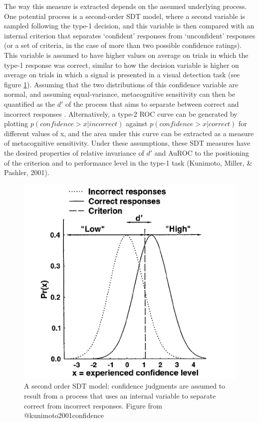\documentclass[12pt,twoside]{reedthesis}
\begin{document}
The way this measure is extracted depends on the assumed underlying process. One potential process is a second-order SDT model, where a second variable is sampled following the type-1 decision, and this variable is then compared with an internal criterion that separates `confident' responses from `unconfident' responses (or a set of criteria, in the case of more than two possible confidence ratings). This variable is assumed to have higher values on average on trials in which the type-1 response was correct, similar to how the decision variable is higher on average on trials in which a signal is presented in a visual detection task (see figure \ref{fig:app1-kunimoto}). Assuming that the two distributions of this confidence variable are normal, and assuming equal-variance, metacognitive sensitivity can then be quantified as the \(d'\) of the process that aims to separate between correct and incorrect responses . Alternatively, a type-2 ROC curve can be generated by plotting \(p(confidence>x|incorrect)\) against \(p(confidence>x|correct)\) for different values of x, and the area under this curve can be extracted as a measure of metacognitive sensitivity. Under these assumptions, these SDT measures have the desired properties of relative invariance of \(d'\) and AuROC to the positioning of the criterion and to performance level in the type-1 task (Kunimoto, Miller, \& Pashler, 2001).
\begin{figure}
\includegraphics[width=0.6\linewidth]{figure/app-SDT/kunimoto} \caption[A second order SDT model]{A second order SDT model: confidence judgments are assumed to result from a process that uses an internal variable to separate correct from incorrect responses. Figure from @kunimoto2001confidence}\label{fig:app1-kunimoto}
\end{figure}
\end{document}
